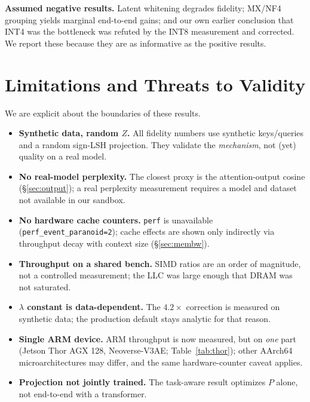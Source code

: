 \documentclass[11pt]{article}
\theoremstyle{plain}
\theoremstyle{definition}
\begin{document}
\noindent\textbf{Assumed negative results.} Latent whitening degrades
fidelity; MX/NF4 grouping yields marginal end-to-end gains; and our own
earlier conclusion that INT4 was the bottleneck was refuted by the INT8
measurement and corrected. We report these because they are as
informative as the positive results.

\section{Limitations and Threats to Validity}
\label{sec:limits}
We are explicit about the boundaries of these results.

\begin{itemize}[leftmargin=1.4em,itemsep=2pt]
  \item \textbf{Synthetic data, random $Z$.} All fidelity numbers use
    synthetic keys/queries and a random sign-LSH projection. They
    validate the \emph{mechanism}, not (yet) quality on a real model.
  \item \textbf{No real-model perplexity.} The closest proxy is the
    attention-output cosine (\S\ref{sec:output}); a real perplexity
    measurement requires a model and dataset not available in our
    sandbox.
  \item \textbf{No hardware cache counters.} \texttt{perf} is
    unavailable (\texttt{perf\_event\_paranoid=2}); cache effects are
    shown only indirectly via throughput decay with context size
    (\S\ref{sec:membw}).
  \item \textbf{Throughput on a shared bench.} SIMD ratios are an order
    of magnitude, not a controlled measurement; the LLC was large enough
    that DRAM was not saturated.
  \item \textbf{$\lambda$ constant is data-dependent.} The $4.2\times$
    correction is measured on synthetic data; the production default
    stays analytic for that reason.
  \item \textbf{Single ARM device.} ARM throughput is now measured, but on
    \emph{one} part (Jetson Thor AGX 128, Neoverse-V3AE; Table~\ref{tab:thor});
    other AArch64 microarchitectures may differ, and the same
    hardware-counter caveat applies.
  \item \textbf{Projection not jointly trained.} The task-aware result
    optimizes $P$ alone, not end-to-end with a transformer.
\end{itemize}
\end{document}

